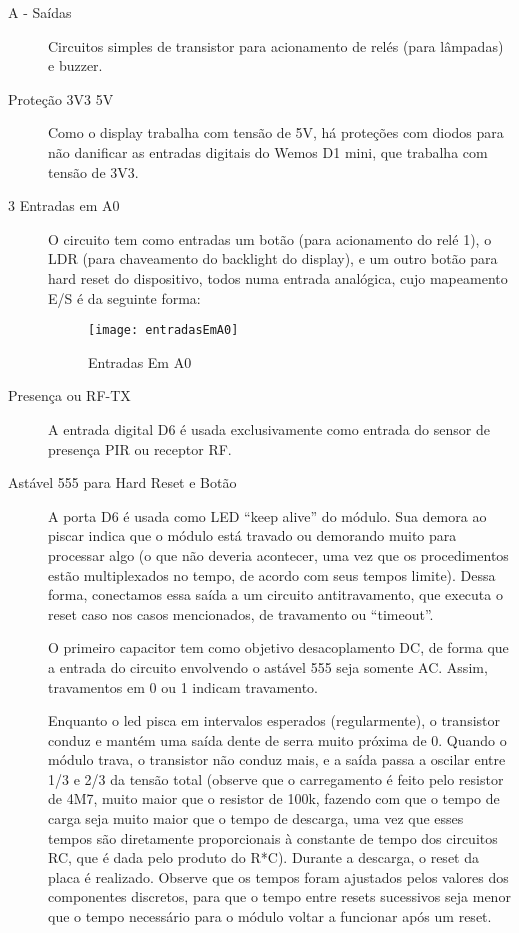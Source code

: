 \begin{description}
\item [A - Saídas] Circuitos simples de transistor para acionamento de relés (para lâmpadas) e buzzer.
\item [Proteção 3V3 5V] Como o display trabalha com tensão de 5V, há proteções com diodos para não danificar as entradas digitais do Wemos D1 mini, que trabalha com tensão de 3V3.
\item [3 Entradas em A0] O circuito tem como entradas um botão (para acionamento do relé 1), o LDR (para chaveamento do backlight do display), e um outro botão para hard reset do dispositivo, todos numa entrada analógica, cujo mapeamento E/S é da seguinte forma:

\begin{figure}[H]
	\centering
	\caption{Entradas Em A0}
  \texttt{[image: entradasEmA0]}
\label{fig:entradasEmA0}
\end{figure}

\item [Presença ou RF-TX] A entrada digital D6 é usada exclusivamente como entrada do sensor de presença PIR ou receptor RF.
\item [Astável 555 para Hard Reset e Botão] A porta D6 é usada como LED “keep alive” do módulo. Sua demora ao piscar indica que o módulo está travado ou demorando muito para processar algo (o que não deveria acontecer, uma vez que os procedimentos estão multiplexados no tempo, de acordo com seus tempos limite). Dessa forma, conectamos essa saída a um circuito antitravamento, que executa o reset caso nos casos mencionados, de travamento ou “timeout”.

O primeiro capacitor tem como objetivo desacoplamento DC, de forma que a entrada do circuito envolvendo o astável 555 seja somente AC. Assim, travamentos em 0 ou 1 indicam travamento.

Enquanto o led pisca em intervalos esperados (regularmente), o transistor conduz e mantém uma saída dente de serra muito próxima de 0. Quando o módulo trava, o transistor não conduz mais, e a saída passa a oscilar entre 1/3 e 2/3 da tensão total (observe que o carregamento é feito pelo resistor de 4M7, muito maior que o resistor de 100k, fazendo com que o tempo de carga seja muito maior que o tempo de descarga, uma vez que esses tempos são diretamente proporcionais à constante de tempo dos circuitos RC, que é dada pelo produto do R*C). Durante a descarga, o reset da placa é realizado. Observe que os tempos foram ajustados pelos valores dos componentes discretos, para que o tempo entre resets sucessivos seja menor que o tempo necessário para o módulo voltar a funcionar após um reset.


\end{description}
